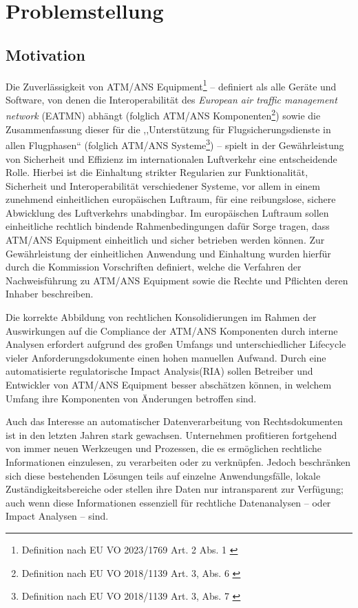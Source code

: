 \chapter{Problemstellung}
    \section{Motivation}

        Die Zuverlässigkeit von ATM/ANS Equipment\footnote{Definition nach EU VO 2023/1769 Art. 2 Abs. 1 \cite{2023R1769}}  -- definiert als alle Geräte und Software, von denen die Interoperabilität des \textit{European air traffic management network} (EATMN) abhängt (folglich ATM/ANS Komponenten\footnote{Definition nach EU VO 2018/1139 Art. 3, Abs. 6 \cite{2018R1139}})  sowie die Zusammenfassung dieser für die ,,Unterstützung für Flugsicherungsdienste in allen Flugphasen`` (folglich ATM/ANS Systeme\footnote{Definition nach EU VO 2018/1139 Art. 3, Abs. 7 \cite{2018R1139}}) -- spielt in der Gewährleistung von Sicherheit und Effizienz im internationalen Luftverkehr eine entscheidende Rolle. 
        Hierbei ist die Einhaltung strikter Regularien zur Funktionalität, Sicherheit und Interoperabilität verschiedener Systeme, vor allem in einem zunehmend einheitlichen europäischen Luftraum, für eine reibungslose, sichere Abwicklung des Luftverkehrs unabdingbar. 
        Im europäischen Luftraum sollen einheitliche rechtlich bindende Rahmenbedingungen dafür Sorge tragen, dass ATM/ANS Equipment einheitlich und sicher betrieben werden können.
        Zur Gewährleistung der einheitlichen Anwendung und Einhaltung wurden hierfür durch die Kommission Vorschriften definiert, welche die Verfahren der Nachweisführung zu ATM/ANS Equipment sowie die Rechte und Pflichten deren Inhaber beschreiben. \cite[Art. 43 Abs. 1]{2018R1139} 
        
    
        Die korrekte Abbildung von rechtlichen Konsolidierungen im Rahmen der Auswirkungen auf die Compliance der ATM/ANS Komponenten durch interne Analysen erfordert aufgrund des großen Umfangs und unterschiedlicher Lifecycle vieler Anforderungsdokumente einen hohen manuellen Aufwand.
        Durch eine automatisierte regulatorische Impact Analysis(RIA) sollen Betreiber und Entwickler von ATM/ANS Equipment besser abschätzen können, in welchem Umfang ihre Komponenten von Änderungen betroffen sind. 


    Auch das Interesse an automatischer Datenverarbeitung von Rechtsdokumenten ist in den letzten Jahren stark gewachsen.
    Unternehmen profitieren fortgehend von immer neuen Werkzeugen und Prozessen, die es ermöglichen rechtliche Informationen einzulesen, zu verarbeiten oder zu verknüpfen.
    Jedoch beschränken sich diese bestehenden Lösungen teils auf einzelne Anwendungsfälle, lokale Zuständigkeitsbereiche oder stellen ihre Daten nur intransparent zur Verfügung\cite[385]{eu_open_legal_info}; auch wenn diese Informationen essenziell für rechtliche Datenanalysen -- oder Impact Analysen -- sind.
    
